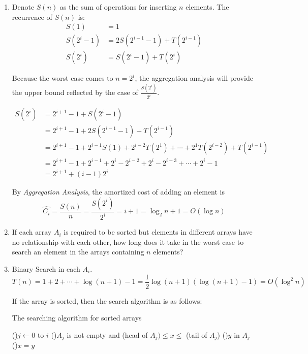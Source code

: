 \documentclass[12pt,a4paper]{article}
\makeatletter
\newtheorem*{solution}{Solution}
\theoremstyle{definition}
\renewenvironment{solution}[1][Solution] {\par\pushQED{\qed}\normalfont\topsep6\p@\@plus6\p@\relax\trivlist\item[\hskip\labelsep\bfseries#1\@addpunct{.}]\ignorespaces}{\popQED\endtrivlist\@endpefalse} \makeatother
\makeatother
\begin{document}
\begin{enumerate}
\begin{enumerate}
\begin{solution}
			Denote $S(n)$ as the sum of operations for inserting $n$ elements. The recurrence of $S(n)$ is:
			\begin{align*}
				S(1) &= 1\\
				S(2^i-1) &= 2S(2^{i-1}-1) + T(2^{i-1})\\
				S(2^i) &= S(2^{i}-1) + T(2^i)
			\end{align*}

			Because the worst case comes to $n=2^i$, the aggregation analysis will provide the upper bound reflected by the case of $\frac{S(2^i)}{2^i}$.

			\begin{align*}
				S(2^i) &= 2^{i+1}-1 + S(2^i-1) \\
					&= 2^{i+1} - 1 + 2S(2^{i-1}-1) + T(2^{i-1})\\
					&= 2^{i+1} - 1 + 2^{i-1}S(1) + 2^{i-2}T(2^1) + \cdots + 2^1T(2^{i-2}) +T(2^{i-1})\\
					&= 2^{i+1} - 1 + 2^{i-1} + 2^i - 2^{i-2} + 2^i - 2^{i-3} + \cdots + 2^i - 1\\
					&= 2^{i+1} +(i-1)2^i
			\end{align*}

			By \emph{Aggregation Analysis}, the amortized cost of adding an element is
			\begin{equation*}
				\hat{C_i} =\frac{S(n)}{n}=\frac{S(2^i)}{2^i} = i+1 = \log_2 n + 1 = O(\log n)
			\end{equation*}
		\end{solution}
        \item If each array $A_i$ is required to be sorted but elements in different arrays have no relationship with each other, how long does it take in the worst case to search an element in the arrays containing $n$ elements? 
    
		\begin{solution}
			Binary Search in each $A_i$.
			\begin{equation*}
				T(n) = 1+2+\cdots+\log(n+1)-1 = \frac{1}{2}\log(n+1)(\log(n+1)-1) = O(\log^2 n)
			\end{equation*}
			\begin{tcolorbox}[skin=mycross]
			If the array is sorted, then the search algorithm is as follows:
			\begin{algorithm}[H]
				\caption{The searching algorithm for sorted arrays}
				\BlankLine
				\For(){$j\leftarrow 0$ to $i$}{
					\If(){$A_j$ is not empty and (head of $A_j) \leq x \leq$ (tail of $A_j$)}{
						\ForEach(){$y$ in $A_j$}{
							\lIf(){$x=y$}{
							}
						}
					}
				}
				\;
			\end{algorithm}


\end{tcolorbox}
\end{solution}
\end{enumerate}
\end{enumerate}
\end{document}
